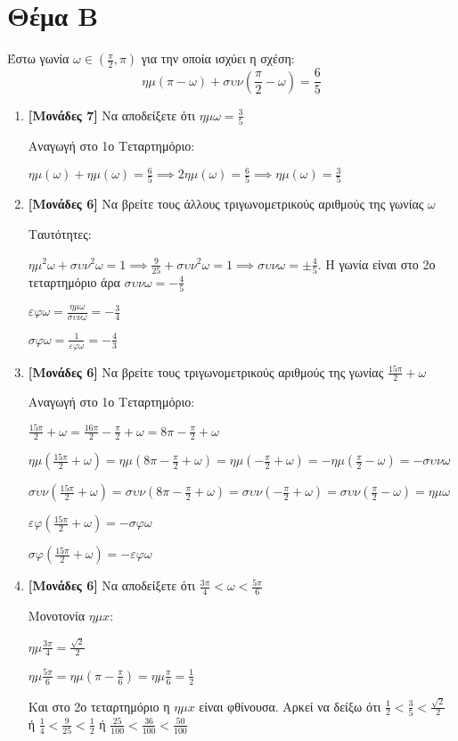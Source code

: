 \documentclass[12pt]{article}
\begin{document}
\section*{Θέμα Β}
\noindent
Έστω γωνία $ω\in\left( \frac{π}{2},π \right)$ για την οποία ισχύει η σχέση:
$$ημ(π-ω)+συν(\frac{π}{2}-ω)=\frac{6}{5}$$
\begin{enumerate}
 \item \textbf{[Μονάδες 7]} Να αποδείξετε ότι $ημω=\frac{3}{5}$

       Αναγωγή στο 1ο Τεταρτημόριο:

       $ημ(ω)+ημ(ω)=\frac{6}{5}\implies 2ημ(ω)=\frac{6}{5}\implies ημ(ω)=\frac{3}{5}$

 \item \textbf{[Μονάδες 6]} Να βρείτε τους άλλους τριγωνομετρικούς αριθμούς της γωνίας $ω$

       Ταυτότητες:

       $ημ^2ω+συν^2ω=1\implies \frac{9}{25}+συν^2ω=1\implies συνω=\pm \frac{4}{5}$. Η γωνία είναι στο 2ο τεταρτημόριο άρα $συνω=-\frac{4}{5}$

       $εφω=\frac{ημω}{συνω}=-\frac{3}{4}$

       $σφω=\frac{1}{εφω}=-\frac{4}{3}$

 \item \textbf{[Μονάδες 6]} Να βρείτε τους τριγωνομετρικούς αριθμούς της γωνίας $\frac{15π}{2}+ω$

       Αναγωγή στο 1ο Τεταρτημόριο:

       $\frac{15π}{2}+ω=\frac{16π}{2}-\frac{π}{2}+ω=8π-\frac{π}{2}+ω$

       $ημ(\frac{15π}{2}+ω)=ημ(8π-\frac{π}{2}+ω)=ημ(-\frac{π}{2}+ω)=-ημ(\frac{π}{2}-ω)=-συνω$

       $συν(\frac{15π}{2}+ω)=συν(8π-\frac{π}{2}+ω)=συν(-\frac{π}{2}+ω)=συν(\frac{π}{2}-ω)=ημω$

       $εφ(\frac{15π}{2}+ω)=-σφω$

       $σφ(\frac{15π}{2}+ω)=-εφω$

 \item \textbf{[Μονάδες 6]} Να αποδείξετε ότι $\frac{3π}{4}<ω<\frac{5π}{6}$

       Μονοτονία $ημx$:

       $ημ\frac{3π}{4}=\frac{\sqrt{2}}{2}$

       $ημ\frac{5π}{6}=ημ(π-\frac{π}{6})=ημ\frac{π}{6}=\frac{1}{2}$

       Και στο 2ο τεταρτημόριο η $ημx$ είναι φθίνουσα. Αρκεί να δείξω ότι $\frac{1}{2}<\frac{3}{5}<\frac{\sqrt{2}}{2}$ ή $\frac{1}{4}<\frac{9}{25}<\frac{1}{2}$ ή $\frac{25}{100}<\frac{36}{100}<\frac{50}{100}$

\end{enumerate}
\end{document}
